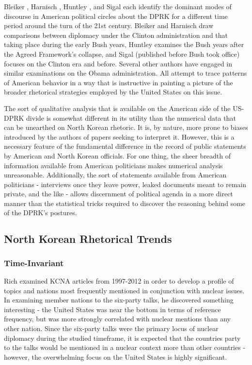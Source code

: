 \documentclass{article}
\begin{document}
Bleiker \cite{bleiker}, Harnisch \cite{harnisch}, Huntley \cite{huntley}, and Sigal \cite{sigal} each identify the dominant modes of discourse in American political circles about the DPRK for a different time period around the turn of the 21st century. Bleiker and Harnisch draw comparisons between diplomacy under the Clinton administration and that taking place during the early Bush years, Huntley examines the Bush years after the Agreed Framework's collapse, and Sigal (published before Bush took office) focuses on the Clinton era and before. Several other authors \cite{crs13,green} have engaged in similar examinations on the Obama administration. All attempt to trace patterns of American behavior in a way that is instructive in painting a picture of the broader rhetorical strategies employed by the United States on this issue.

The sort of qualitative analysis that is available on the American side of the US-DPRK divide is somewhat different in its utility than the numerical data that can be unearthed on North Korean rhetoric. It is, by nature, more prone to biases introduced by the authors of papers seeking to interpret it. However, this is a necessary feature of the fundamental difference in the record of public statements by American and North Korean officials. For one thing, the sheer breadth of information available from American politicians makes numerical analysis unreasonable. Additionally, the sort of statements available from American politicians - interviews once they leave power, leaked documents meant to remain private, and the like - allows discernment of political agenda in a more direct manner than the statistical tricks required to discover the reasoning behind some of the DPRK's postures. %

\subsection{North Korean Rhetorical Trends}
\subsubsection{Time-Invariant}
Rich \cite{rich14} examined KCNA articles from 1997-2012 in order to develop a profile of topics and nations most frequently mentioned in conjunction with nuclear issues. In examining member nations to the six-party talks, he discovered something interesting -  the United States was near the bottom in terms of reference frequency, but was more strongly correlated with nuclear mentions than any other nation. Since the six-party talks were the primary locus of nuclear diplomacy during the studied timeframe, it is expected that the countries party to the talks would be mentioned in a nuclear context more than other countries - however, the overwhelming focus on the United States is highly significant.
\end{document}
